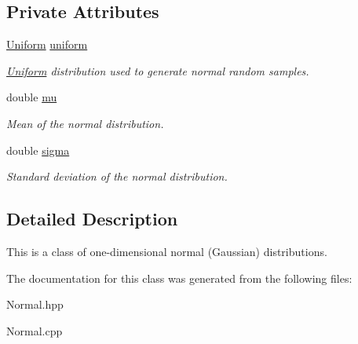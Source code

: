\subsection*{Private Attributes}
\begin{DoxyCompactItemize}
\item 
\mbox{\label{class_normal_a206a8e2aeaea2ed71218fed4af5cac22}} 
\hyperlink{class_uniform}{Uniform} \hyperlink{class_normal_a206a8e2aeaea2ed71218fed4af5cac22}{uniform}
\begin{DoxyCompactList}\small\item\em \hyperlink{class_uniform}{Uniform} distribution used to generate normal random samples. \end{DoxyCompactList}\item 
\mbox{\label{class_normal_ae96fa398a2a81b7c9b6fa620591be505}} 
double \hyperlink{class_normal_ae96fa398a2a81b7c9b6fa620591be505}{mu}
\begin{DoxyCompactList}\small\item\em Mean of the normal distribution. \end{DoxyCompactList}\item 
\mbox{\label{class_normal_a21090738bd2f532e36026d9536e565af}} 
double \hyperlink{class_normal_a21090738bd2f532e36026d9536e565af}{sigma}
\begin{DoxyCompactList}\small\item\em Standard deviation of the normal distribution. \end{DoxyCompactList}\end{DoxyCompactItemize}


\subsection{Detailed Description}
This is a class of one-\/dimensional normal (Gaussian) distributions. 

The documentation for this class was generated from the following files\+:\begin{DoxyCompactItemize}
\item 
Normal.\+hpp\item 
Normal.\+cpp\end{DoxyCompactItemize}
